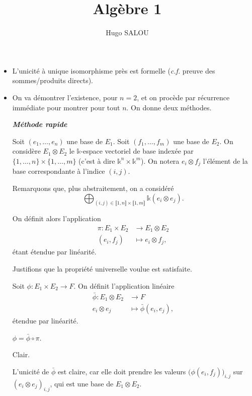 \documentclass{../../notes}
\title{Algèbre 1}
\author{Hugo SALOU}
\begin{document}
  \maketitle

  \begin{prv}
    \begin{itemize}
      \item L'unicité à unique isomorphisme près est formelle (\textit{c.f.} preuve des sommes/produits directs).
      \item On va démontrer l'existence, pour $n = 2$, et on procède par récurrence immédiate pour montrer pour tout $n$.
        On donne deux méthodes.

        \begin{center}
          \textbf{\textit{Méthode rapide}}
        \end{center}

        Soit $(e_1, \ldots, e_n)$ une base de $E_1$.
        Soit $(f_1, \ldots, f_m)$ une base de $E_2$.
        On considère $E_1 \otimes E_2$ le $\mathds{k}$-espace vectoriel de base indexée par $\{1,\ldots,n\} \times \{1,\ldots,m\}$ (c'est à dire $\mathds{k}^n \times \mathds{k}^m$).
        On notera $e_i \otimes f_j$ l'élément de la base correspondante à l'indice $(i,j)$.

        Remarquons que, plus abstraitement, on a considéré \[
          \bigoplus_{(i,j) \in \llbracket 1,n\rrbracket \times \llbracket 1,m\rrbracket   } \mathds{k} (e_i \otimes e_j)
        .\]

        On définit alors l'application \begin{align*}
          \pi: E_1 \times E_2 &\longrightarrow E_1 \otimes E_2 \\
          (e_i, f_j) &\longmapsto e_i \otimes f_j
        ,\end{align*}
        étant étendue par linéarité.

        Justifions que la propriété universelle voulue est satisfaite.

        Soit $\phi : E_1 \times E_2 \to F$.
        On définit l'application linéaire 
        \begin{align*}
          \bar{\phi}: E_1 \otimes E_2 &\longrightarrow F \\
          e_i \otimes e_j &\longmapsto \bar{\phi}(e_i, e_j)
        ,\end{align*}
        étendue par linéarité.

        \begin{obs}
          $\phi  = \bar{\phi} \circ \pi$.
        \end{obs}
        \begin{expl}
          Clair.
        \end{expl}
        L'unicité de $ \bar{\phi}$ est claire, car elle doit prendre les valeurs $\big(\phi(e_i, f_j)\big)_{i,j}$ sur $(e_i \otimes e_j)_{i,j}$, qui est une base de $E_1 \otimes E_2$.



\end{itemize}
\end{prv}
\end{document}
